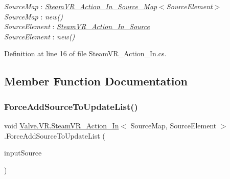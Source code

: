 \begin{Desc}
\item[Type Constraints]\begin{description}
\item[{\em Source\+Map} : {\em \mbox{\hyperlink{class_valve_1_1_v_r_1_1_steam_v_r___action___in___source___map}{Steam\+V\+R\+\_\+\+Action\+\_\+\+In\+\_\+\+Source\+\_\+\+Map}}$<$Source\+Element$>$}]\item[{\em Source\+Map} : {\em new()}]\item[{\em Source\+Element} : {\em \mbox{\hyperlink{class_valve_1_1_v_r_1_1_steam_v_r___action___in___source}{Steam\+V\+R\+\_\+\+Action\+\_\+\+In\+\_\+\+Source}}}]\item[{\em Source\+Element} : {\em new()}]\end{description}
\end{Desc}


Definition at line 16 of file Steam\+V\+R\+\_\+\+Action\+\_\+\+In.\+cs.



\subsection{Member Function Documentation}
\mbox{\label{class_valve_1_1_v_r_1_1_steam_v_r___action___in_af39cd279bc56854ce6cf89402e405a1c}} 
\subsubsection{\texorpdfstring{ForceAddSourceToUpdateList()}{ForceAddSourceToUpdateList()}}
{\footnotesize\ttfamily void \mbox{\hyperlink{class_valve_1_1_v_r_1_1_steam_v_r___action___in}{Valve.\+V\+R.\+Steam\+V\+R\+\_\+\+Action\+\_\+\+In}}$<$ Source\+Map, Source\+Element $>$.Force\+Add\+Source\+To\+Update\+List (\begin{DoxyParamCaption}\item[{\mbox{\hyperlink{namespace_valve_1_1_v_r_a82e5bf501cc3aa155444ee3f0662853f}{Steam\+V\+R\+\_\+\+Input\+\_\+\+Sources}}}]{input\+Source }\end{DoxyParamCaption})}



